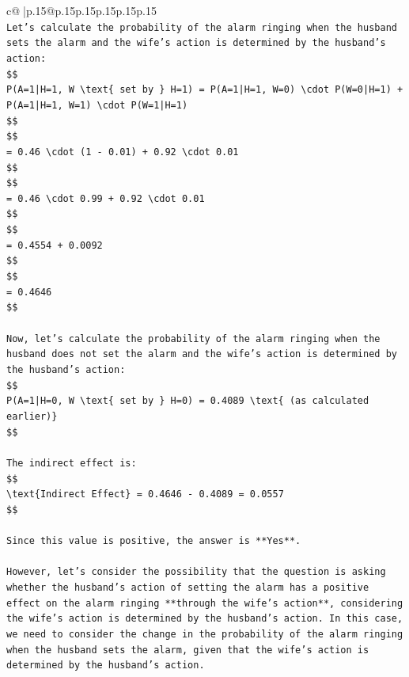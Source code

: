 \documentclass{article}
\begin{document}
{\begin{supertabular}{c@{$\;$}|p{.15\linewidth}@{}p{.15\linewidth}p{.15\linewidth}p{.15\linewidth}p{.15\linewidth}p{.15\linewidth}}
{{{\\ 
\texttt{Let's calculate the probability of the alarm ringing when the husband sets the alarm and the wife's action is determined by the husband's action:} \\
\texttt{\$\$} \\
\texttt{P(A=1|H=1, W \textbackslash{}text\{ set by \} H=1) = P(A=1|H=1, W=0) \textbackslash{}cdot P(W=0|H=1) + P(A=1|H=1, W=1) \textbackslash{}cdot P(W=1|H=1)} \\
\texttt{\$\$} \\
\texttt{\$\$} \\
\texttt{= 0.46 \textbackslash{}cdot (1 {-} 0.01) + 0.92 \textbackslash{}cdot 0.01} \\
\texttt{\$\$} \\
\texttt{\$\$} \\
\texttt{= 0.46 \textbackslash{}cdot 0.99 + 0.92 \textbackslash{}cdot 0.01} \\
\texttt{\$\$} \\
\texttt{\$\$} \\
\texttt{= 0.4554 + 0.0092} \\
\texttt{\$\$} \\
\texttt{\$\$} \\
\texttt{= 0.4646} \\
\texttt{\$\$} \\
\\ 
\texttt{Now, let's calculate the probability of the alarm ringing when the husband does not set the alarm and the wife's action is determined by the husband's action:} \\
\texttt{\$\$} \\
\texttt{P(A=1|H=0, W \textbackslash{}text\{ set by \} H=0) = 0.4089 \textbackslash{}text\{ (as calculated earlier)\}} \\
\texttt{\$\$} \\
\\ 
\texttt{The indirect effect is:} \\
\texttt{\$\$} \\
\texttt{\textbackslash{}text\{Indirect Effect\} = 0.4646 {-} 0.4089 = 0.0557} \\
\texttt{\$\$} \\
\\ 
\texttt{Since this value is positive, the answer is **Yes**.} \\
\\ 
\texttt{However, let's consider the possibility that the question is asking whether the husband's action of setting the alarm has a positive effect on the alarm ringing **through the wife's action**, considering the wife's action is determined by the husband's action. In this case, we need to consider the change in the probability of the alarm ringing when the husband sets the alarm, given that the wife's action is determined by the husband's action.} \\
}}}
\end{supertabular}}
\end{document}
